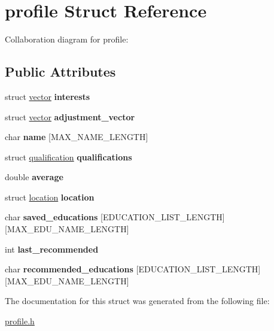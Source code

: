 \hypertarget{structprofile}{}\section{profile Struct Reference}
\label{structprofile}


Collaboration diagram for profile\+:
\subsection*{Public Attributes}
\begin{DoxyCompactItemize}
\item 
\mbox{\label{structprofile_a313de9760bb4abc3125aedcdc2d8e464}} 
struct \hyperlink{structvector}{vector} {\bfseries interests}
\item 
\mbox{\label{structprofile_a228b35200c8acd36c799e65fb9ee8c82}} 
struct \hyperlink{structvector}{vector} {\bfseries adjustment\+\_\+vector}
\item 
\mbox{\label{structprofile_aa5f452c2e28f63f9947b7c62d099ce9c}} 
char {\bfseries name} \mbox{[}M\+A\+X\+\_\+\+N\+A\+M\+E\+\_\+\+L\+E\+N\+G\+TH\mbox{]}
\item 
\mbox{\label{structprofile_ad4a90ac3791cc3a1fab5824fb9771ed5}} 
struct \hyperlink{structqualification}{qualification} {\bfseries qualifications}
\item 
\mbox{\label{structprofile_a1c5f94e6a8da32cfef600b126dc5fccb}} 
double {\bfseries average}
\item 
\mbox{\label{structprofile_ae86aa2c5432de3cb2705d2269b2e1b86}} 
struct \hyperlink{structlocation}{location} {\bfseries location}
\item 
\mbox{\label{structprofile_a3761452afdcb4ead85f3c8162c08a87f}} 
char {\bfseries saved\+\_\+educations} \mbox{[}E\+D\+U\+C\+A\+T\+I\+O\+N\+\_\+\+L\+I\+S\+T\+\_\+\+L\+E\+N\+G\+TH\mbox{]}\mbox{[}M\+A\+X\+\_\+\+E\+D\+U\+\_\+\+N\+A\+M\+E\+\_\+\+L\+E\+N\+G\+TH\mbox{]}
\item 
\mbox{\label{structprofile_a642839ebfcadc7b5f50429830f573c85}} 
int {\bfseries last\+\_\+recommended}
\item 
\mbox{\label{structprofile_a2ad59943b1463691981170ca9391fdf4}} 
char {\bfseries recommended\+\_\+educations} \mbox{[}E\+D\+U\+C\+A\+T\+I\+O\+N\+\_\+\+L\+I\+S\+T\+\_\+\+L\+E\+N\+G\+TH\mbox{]}\mbox{[}M\+A\+X\+\_\+\+E\+D\+U\+\_\+\+N\+A\+M\+E\+\_\+\+L\+E\+N\+G\+TH\mbox{]}
\end{DoxyCompactItemize}


The documentation for this struct was generated from the following file\+:\begin{DoxyCompactItemize}
\item 
\hyperlink{profile_8h}{profile.\+h}\end{DoxyCompactItemize}
